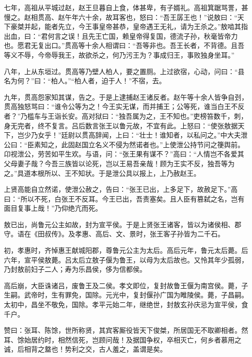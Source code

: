 \documentclass[12pt,UTF8]{ctexbook}
\begin{document}
七年，高祖从平城过赵，赵王旦暮自上食，体甚卑，有子婿礼。高祖箕踞骂詈，甚慢之。赵相贯高、赵午年六十余，故耳客也，怒曰：“吾王孱王也！”说敖曰：“天下豪桀并起，能者先立，今王事皇帝甚恭，皇帝遇王无礼，请为王杀之。”敖啮其指出血，曰：“君何言之误！且先王亡国，赖皇帝得复国，德流子孙，秋毫皆帝力也。愿君无复出口。”贯高等十余人相谓曰：“吾等非也。吾王长者，不背德。且吾等义不辱，今帝辱我王，故欲杀之，何乃污王为？事成归王，事败独身坐耳。”



八年，上从东垣过。贯高等乃壁人柏人，要之置厕。上过欲宿，心动，问曰：“县名为何？”曰：“柏人。”“柏人者，迫于人！”不宿，去。



九年，贯高怨家知其谋，告之。于是上逮捕赵王诸反者。赵午等十余人皆争自刭，贯高独怒骂曰：“谁令公等为之！今王实无谋，而并捕王；公等死，谁当白王不反者？”乃槛车与王诣长安。高对狱曰：“独吾属为之，王不知也。”吏榜笞数千，刺，身无完者，终不复言。吕后数言张王以鲁元故，不宜有此。上怒曰：“使张敖据天下，岂少乃女乎！”廷尉以贯高辞闻，上曰：“壮士！谁知者，以私问之。”中大夫泄公曰：“臣素知之，此固赵国立名义不侵为然诺者也。”上使泄公持节问之箯舆前。卬视泄公，劳苦如平生欢。与语，问：“张王果有谋不？”高曰：“人情岂不各爱其父母妻子哉？今吾三族皆以论死，岂以王易吾亲哉！顾为王实不反，独吾等为之。”具道本根所以、王不知状。于是泄公具以报上，上乃赦赵王。



上贤高能自立然诺，使泄公赦之，告曰：“张王已出，上多足下，故赦足下。”高曰：“所以不死，白张王不反耳。今王已出，吾责塞矣。且人臣有篡弑之名，岂有面目复事上哉！”乃仰绝亢而死。



敖已出，尚鲁元公主如故，封为宣平侯。于是上贤张王诸客，皆以为诸侯相、郡守。语在《田叔传》。及孝惠、高后、文、景时，张王客子孙皆为二千石。



初，孝惠时，齐悼惠王献城阳郡，尊鲁元公主为太后。高后元年，鲁元太后薨。后六年，宣平侯敖薨。吕太后立敖子偃为鲁王，以母为太后故也。又怜其年少孤弱，乃封敖前妇子二人；寿为乐昌侯，侈为信都侯。



高后崩，大臣诛诸吕，废鲁王及二侯。孝文即位，复封故鲁王偃为南宫侯。薨，子生嗣。武帝时，生有罪免，国除。元光中，复封偃孙广国为睢陵侯。薨，子昌嗣。太初中，昌坐不敬免，国除。孝平元始二年，继绝世，封敖玄孙庆忌为宣平侯，食千户。



赞曰：张耳、陈馀，世所称贤，其宾客厮役皆天下俊桀，所居国无不取卿相者。然耳、馀始居约时，相然信死，岂顾问哉！及据国争权，卒相灭亡，何乡者慕用之诚，后相背之盩也！势利之交，古人羞之，盖谓是矣。
\end{document}

